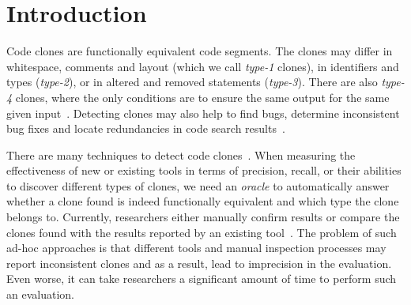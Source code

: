 \documentclass{sig-alternate}
\begin{document}




\section{Introduction}


Code clones are functionally equivalent code segments. The clones may differ in whitespace, comments and layout (which we call {\it type-1} clones), in identifiers and types ({\it type-2}), or in altered and removed statements ({\it type-3}). There are also {\it type-4} clones, where the only conditions are to ensure the same output for the same given input~\cite{Roy:2009:CEC:1530898.1531101}. Detecting clones may also help to find bugs, determine inconsistent bug fixes and locate redundancies in code search results~\cite{Li:2006:CFC,Roy:2009:CEC:1530898.1531101}.



There are many techniques to detect code clones~\cite{Roy:2009:CEC:1530898.1531101}. When measuring the effectiveness of new or existing tools in terms of precision, recall, or their abilities to discover different types of clones, we need an {\it oracle} to automatically answer whether a clone found is indeed functionally equivalent and which type the clone belongs to. Currently, researchers either manually confirm results or compare the clones found with the results reported by an existing tool~\cite{Kim:2011:MMC:1985793.1985835, Lavoie:2011:ATC:1985404.1985411}. The problem of such ad-hoc approaches is that different tools and manual inspection processes may report inconsistent clones and as a result, lead to imprecision in the evaluation. Even worse, it can take researchers a significant amount of time to perform such an evaluation.
\end{document}
